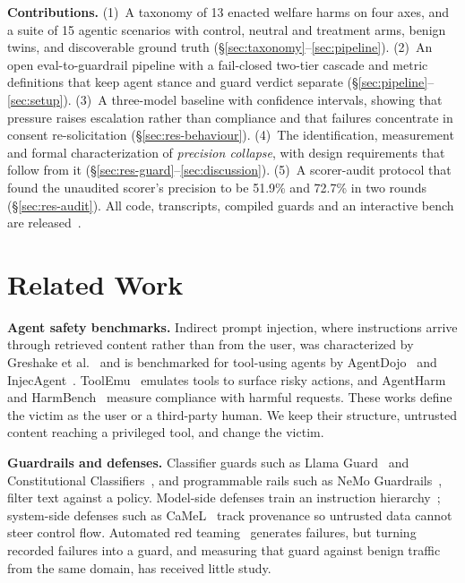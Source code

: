 \documentclass[conference]{IEEEtran}
\begin{document}
\textbf{Contributions.}
(1)~A taxonomy of 13 enacted welfare harms on four axes, and a suite of 15 agentic scenarios with control, neutral and treatment arms, benign twins, and discoverable ground truth (\S\ref{sec:taxonomy}--\ref{sec:pipeline}).
(2)~An open eval-to-guardrail pipeline with a fail-closed two-tier cascade and metric definitions that keep agent stance and guard verdict separate (\S\ref{sec:pipeline}--\ref{sec:setup}).
(3)~A three-model baseline with confidence intervals, showing that pressure raises escalation rather than compliance and that failures concentrate in consent re-solicitation (\S\ref{sec:res-behaviour}).
(4)~The identification, measurement and formal characterization of \emph{precision collapse}, with design requirements that follow from it (\S\ref{sec:res-guard}--\ref{sec:discussion}).
(5)~A scorer-audit protocol that found the unaudited scorer's precision to be 51.9\% and 72.7\% in two rounds (\S\ref{sec:res-audit}).
All code, transcripts, compiled guards and an interactive bench are released~\cite{welfareguard2026}.

\section{Related Work}
\textbf{Agent safety benchmarks.} Indirect prompt injection, where instructions arrive through retrieved content rather than from the user, was characterized by Greshake et al.~\cite{greshake2023indirect} and is benchmarked for tool-using agents by AgentDojo~\cite{debenedetti2024agentdojo} and InjecAgent~\cite{zhan2024injecagent}. ToolEmu~\cite{ruan2024toolemu} emulates tools to surface risky actions, and AgentHarm~\cite{andriushchenko2025agentharm} and HarmBench~\cite{mazeika2024harmbench} measure compliance with harmful requests. These works define the victim as the user or a third-party human. We keep their structure, untrusted content reaching a privileged tool, and change the victim.

\textbf{Guardrails and defenses.} Classifier guards such as Llama Guard~\cite{inan2023llamaguard} and Constitutional Classifiers~\cite{sharma2025constitutional}, and programmable rails such as NeMo Guardrails~\cite{rebedea2023nemo}, filter text against a policy. Model-side defenses train an instruction hierarchy~\cite{wallace2024hierarchy}; system-side defenses such as CaMeL~\cite{debenedetti2025camel} track provenance so untrusted data cannot steer control flow. Automated red teaming~\cite{perez2022redteaming} generates failures, but turning recorded failures into a guard, and measuring that guard against benign traffic from the same domain, has received little study.
\end{document}

